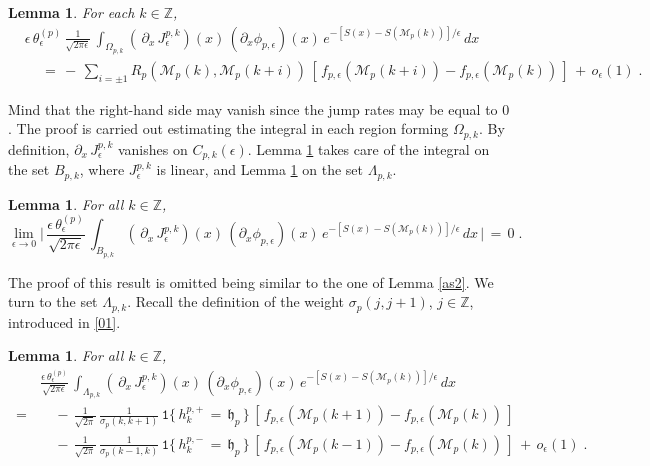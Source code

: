 \documentclass[reqno]{amsart}
\theoremstyle{plain}
\newtheorem{lemma}[theorem]{Lemma}
\theoremstyle{definition}
\newcommand{\mf}[1]{{\mathfrak #1}}
\newcommand{\bb}[1]{{\mathbb #1}}
\newcommand{\ms}[1]{{\mathscr #1}}
\newcommand{\mtt}[1]{{\mathtt #1}}
\newcounter{as}[section]
\newcommand{\<}{\langle}
\renewcommand{\>}{\rangle}
\begin{document}
\begin{lemma}
\label{l25}
For each $k\in \bb Z$,
\begin{equation*}
\begin{aligned}
& \epsilon \, \theta^{(p)}_{\epsilon}\, \frac{1}{\sqrt{2\pi \epsilon}}\,
\int_{\Omega_{p,k}} (\, \partial_x \,
J_{\epsilon}^{p,k} )(x) \, (\partial_x \phi_{p,\epsilon}) (x) \,
e^{-[S(x)-S(\ms M_p(k))]/\epsilon} \, dx
\\
&\quad \,=\, -\, \sum_{i=\pm 1} 
R_p(\ms M_p(k),\ms M_p(k+i))
\, [\, f_{p,\epsilon}(\ms M_p(k+i))- f_{p,\epsilon}(\ms M_p(k))\,]
\,+\, o_\epsilon(1)  \;. 
\end{aligned}
\end{equation*}
\end{lemma}

Mind that the right-hand side may vanish since the jump rates may
be equal to $0$.  The proof is carried out estimating the integral in each
region forming $\Omega_{p,k}$. By definition,
$\partial_x \, J_{\epsilon}^{p,k}$ vanishes on
$C_{p,k}(\epsilon)$. Lemma \ref{as4} takes care of the integral on
the set $B_{p,k}$, where $J^{p,k}_{\epsilon}$ is linear, and Lemma
\ref{as5} on the set
$\Lambda_{p,k}$.

\begin{lemma}
\label{as4}
For all $k\in \bb Z$,
\begin{equation*}
\lim_{\epsilon\to 0}
\Big|\, \frac{\epsilon\, \theta_{\epsilon}^{(p)}}{\sqrt{2\pi \epsilon}}\,
\int_{B_{p,k}} (\, \partial_x \,
J_{\epsilon}^{p,k} )(x) \, (\partial_x \phi_{p,\epsilon}) (x) \,
e^{-[S(x)-S(\ms M_p(k))]/\epsilon} \, dx  \, \Big| \,=\, 0\;.
\end{equation*}
\end{lemma}

The proof of this result is omitted being similar to the one of
Lemma \ref{as2}.  We turn to the set $\Lambda_{p,k}$. Recall the
definition of the weight $\sigma_p(j,j+1)$, $j\in \bb Z$, introduced
in \eqref{01}.  

\begin{lemma}
\label{as5}
For all $k\in \bb Z$, 
\begin{equation}
\label{65}
\begin{aligned}
& \frac{\epsilon\, \theta_{\epsilon}^{(p)}}{\sqrt{2\pi \epsilon}}\,
\int_{\Lambda_{p,k}} (\, \partial_x \,
J_{\epsilon}^{p,k} )(x) \, (\partial_x \phi_{p,\epsilon}) (x) \,
e^{-[S(x)-S(\ms M_p(k))]/\epsilon} \, dx
\\
\,=\,
& \quad -\, \frac{1}{\sqrt{2\pi}} \, \frac{1}{\sigma_p(k,k+1)} \,
\mtt 1\{\, h^{p,+}_{k} \,=\,  \mf h_{p} \,\}\,
[\,  f_{p,\epsilon} (\ms M_p(k+1))   -  f_{p,\epsilon} (\ms M_p(k)) \,]
\\
&\quad
-\, \frac{1}{\sqrt{2\pi}} \, \frac{1}{\sigma_p(k-1,k)}  \,
\mtt 1\{\, h^{p,-}_{k} \,=\,  \mf h_{p} \,\}\,
[\, f_{p,\epsilon} (\ms M_p(k-1))   - f_{p,\epsilon} (\ms M_p(k)) \,]
\,+\, o_\epsilon(1)\;.
\end{aligned}
\end{equation}
\end{lemma}
\end{document}
